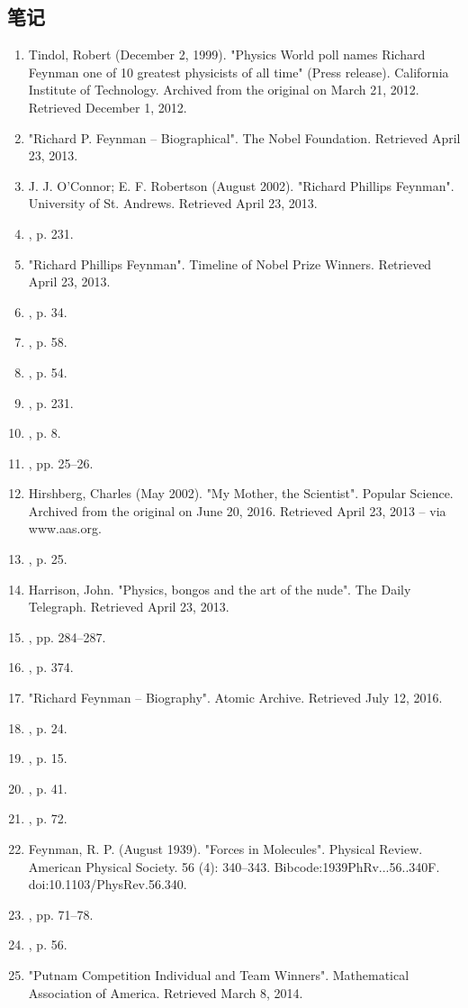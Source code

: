 \subsection{笔记}
\begin{enumerate}
\item Tindol, Robert (December 2, 1999). "Physics World poll names Richard Feynman one of 10 greatest physicists of all time" (Press release). California Institute of Technology. Archived from the original on March 21, 2012. Retrieved December 1, 2012.
\item "Richard P. Feynman – Biographical". The Nobel Foundation. Retrieved April 23, 2013.
\item J. J. O'Connor; E. F. Robertson (August 2002). "Richard Phillips Feynman". University of St. Andrews. Retrieved April 23, 2013.
\item , p. 231.
\item "Richard Phillips Feynman". Timeline of Nobel Prize Winners. Retrieved April 23, 2013.
\item , p. 34.
\item , p. 58.
\item , p. 54.
\item , p. 231.
\item , p. 8.
\item , pp. 25–26.
\item Hirshberg, Charles (May 2002). "My Mother, the Scientist". Popular Science. Archived from the original on June 20, 2016. Retrieved April 23, 2013 – via www.aas.org.
\item , p. 25.
\item Harrison, John. "Physics, bongos and the art of the nude". The Daily Telegraph. Retrieved April 23, 2013.
\item , pp. 284–287.
\item , p. 374.
\item "Richard Feynman – Biography". Atomic Archive. Retrieved July 12, 2016.
\item , p. 24.
\item , p. 15.
\item , p. 41.
\item , p. 72.
\item Feynman, R. P. (August 1939). "Forces in Molecules". Physical Review. American Physical Society. 56 (4): 340–343. Bibcode:1939PhRv...56..340F. doi:10.1103/PhysRev.56.340.
\item , pp. 71–78.
\item , p. 56.
\item "Putnam Competition Individual and Team Winners". Mathematical Association of America. Retrieved March 8, 2014.

\end{enumerate}
